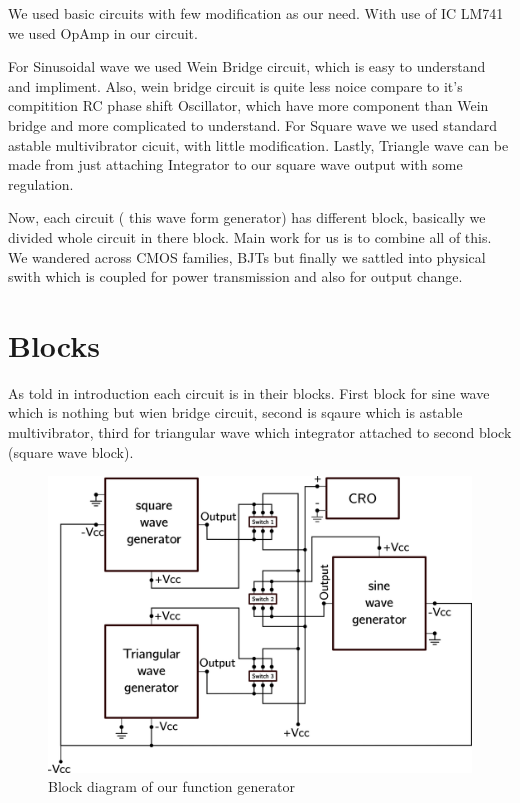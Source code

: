 \documentclass{article}
\begin{document}
We used basic circuits with few modification as our need. With use of IC LM741 we used OpAmp in our circuit. 

For Sinusoidal wave we used Wein Bridge circuit, which is easy to understand and impliment. Also, wein bridge circuit is quite less noice compare to it's compitition RC phase shift Oscillator, which have more component than Wein bridge and more complicated to understand. For Square wave we used standard astable multivibrator cicuit, with little modification. Lastly, Triangle wave can be made from just attaching Integrator to our square wave output with some regulation.

Now, each circuit ( this wave form generator) has different block, basically we divided whole circuit in there block. Main work for us is to combine all of this. We wandered across CMOS families, BJTs but finally we sattled into physical swith which is coupled for power transmission and also for output change.

\section{Blocks}
\label{sec:org79cad12}


As told in introduction each circuit is in their blocks. First block for sine wave which is nothing but wien bridge circuit, second is sqaure which is astable multivibrator, third for triangular wave which integrator attached to second block (square wave block).


\begin{figure}[htbp]
\centering
\includegraphics[width=.95\textwidth]{imgs/blocks.png}
\caption{\label{fig:org9716e1a}Block diagram of our function generator}
\end{figure}
\end{document}
